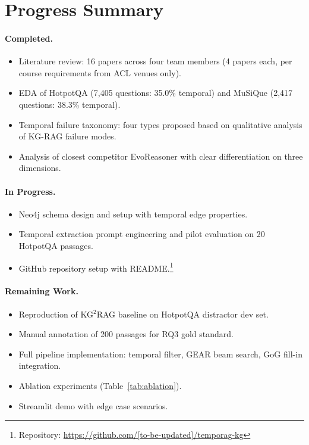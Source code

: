 \documentclass[11pt]{article}
\begin{document}
\section{Progress Summary}

\paragraph{Completed.}
\begin{itemize}
  \item Literature review: 16 papers across four team members
    (4 papers each, per course requirements from ACL venues only).
  \item EDA of HotpotQA (7,405 questions: 35.0\% temporal) and
    MuSiQue (2,417 questions: 38.3\% temporal).
  \item Temporal failure taxonomy: four types proposed based on
    qualitative analysis of KG-RAG failure modes.
  \item Analysis of closest competitor EvoReasoner \cite{evoreasonerevokg2025}
    with clear differentiation on three dimensions.
\end{itemize}

\paragraph{In Progress.}
\begin{itemize}
  \item Neo4j schema design and setup with temporal edge properties.
  \item Temporal extraction prompt engineering and pilot evaluation
    on 20 HotpotQA passages.
  \item GitHub repository setup with README.\footnote{
    Repository: \url{https://github.com/[to-be-updated]/temporag-kg}}
\end{itemize}

\paragraph{Remaining Work.}
\begin{itemize}
  \item Reproduction of KG$^2$RAG baseline on HotpotQA distractor dev set.
  \item Manual annotation of 200 passages for RQ3 gold standard.
  \item Full pipeline implementation: temporal filter, GEAR beam search,
    GoG fill-in integration.
  \item Ablation experiments (Table~\ref{tab:ablation}).
  \item Streamlit demo with edge case scenarios.
\end{itemize}
\end{document}

